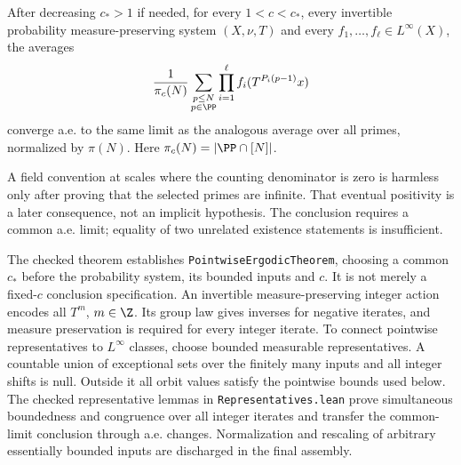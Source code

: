 \begin{theorem}\label{t:pointwise}
\leanok
After decreasing $c_*>1$ if needed, for every $1<c<c_*$, every invertible probability measure-preserving system $(X,\nu,T)$ and every $f_1,\ldots,f_\ell\in L^\infty(X)$, the averages
\[
 \frac1{\pi_c(N)}\sum_{\substack{p\leq N\\p\in\PP}}
 \prod_{i=1}^{\ell}f_i(T^{P_i(p-1)}x)
\]
converge a.e. to the same limit as the analogous average over all primes, normalized by $\pi(N)$. Here $\pi_c(N)=|\PP\cap[N]|$.
\end{theorem}
\ifDetailed
A field convention at scales where the counting denominator is zero is harmless only after proving that the selected primes are infinite. That eventual positivity is a later consequence, not an implicit hypothesis. The conclusion requires a common a.e. limit; equality of two unrelated existence statements is insufficient.

The checked theorem establishes \texttt{PointwiseErgodicTheorem}, choosing a common $c_*$ before the probability system, its bounded inputs and $c$. It is not merely a fixed-$c$ conclusion specification. An invertible measure-preserving integer action encodes all $T^m$, $m\in\Z$. Its group law gives inverses for negative iterates, and measure preservation is required for every integer iterate. To connect pointwise representatives to $L^\infty$ classes, choose bounded measurable representatives. A countable union of exceptional sets over the finitely many inputs and all integer shifts is null. Outside it all orbit values satisfy the pointwise bounds used below. The checked representative lemmas in \texttt{Representatives.lean} prove simultaneous boundedness and congruence over all integer iterates and transfer the common-limit conclusion through a.e. changes. Normalization and rescaling of arbitrary essentially bounded inputs are discharged in the final assembly.
\fi

